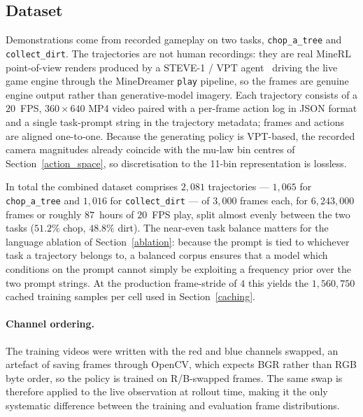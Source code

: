 \subsection{Dataset}
Demonstrations come from recorded gameplay on two tasks,
\texttt{chop\_a\_tree} and \texttt{collect\_dirt}. The trajectories are not
human recordings: they are real MineRL point-of-view renders produced by a
STEVE-1 / VPT agent~\cite{lifshitz2023steve1, baker2022vpt} driving the live
game engine through the MineDreamer \texttt{play} pipeline, so the frames are
genuine engine output rather than generative-model imagery.
Each trajectory consists of a $20$~FPS, $360 \times 640$ MP4 video paired
with a per-frame action log in JSON format and a single task-prompt string in
the trajectory metadata; frames and actions are aligned one-to-one. Because
the generating policy is VPT-based, the recorded camera magnitudes already
coincide with the mu-law bin centres of Section~\ref{action_space}, so
discretisation to the 11-bin representation is lossless.

In total the combined dataset comprises $2{,}081$ trajectories --- $1{,}065$ for
\texttt{chop\_a\_tree} and $1{,}016$ for \texttt{collect\_dirt} --- of $3{,}000$
frames each, for $6{,}243{,}000$ frames or roughly $87$~hours of $20$~FPS play,
split almost evenly between the two tasks ($51.2\%$ chop, $48.8\%$ dirt). The
near-even task balance matters for the language ablation of
Section~\ref{ablation}: because the prompt is tied to whichever task a trajectory
belongs to, a balanced corpus ensures that a model which conditions on the prompt
cannot simply be exploiting a frequency prior over the two prompt strings. At the
production frame-stride of $4$ this yields the $1{,}560{,}750$ cached training
samples per cell used in Section~\ref{caching}.

\paragraph{Channel ordering.} The training videos were written with the red
and blue channels swapped, an artefact of saving frames through OpenCV, which
expects BGR rather than RGB byte order, so the policy is trained on
R/B-swapped frames. The same swap is therefore applied to the live
observation at rollout time, making it the only systematic difference between
the training and evaluation frame distributions.

